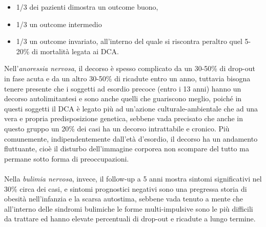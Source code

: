 \begin{itemize}
\item
  1/3 dei pazienti dimostra un outcome buono,
\item
  1/3 un outcome intermedio
\item
  1/3 un outcome invariato, all'interno del quale si riscontra peraltro
  quel 5-20\% di mortalità legata ai DCA.
\end{itemize}

Nell'\emph{anoressia nervosa}, il decorso è spesso complicato da un
30-50\% di drop-out in fase acuta e da un altro 30-50\% di ricadute
entro un anno, tuttavia bisogna tenere presente che i soggetti ad
esordio precoce (entro i 13 anni) hanno un decorso autolimitantesi e
sono anche quelli che guariscono meglio, poiché in questi soggetti il
DCA è legato più ad un'azione culturale-ambientale che ad una vera e
propria predisposizione genetica, sebbene vada precisato che anche in
questo gruppo un 20\% dei casi ha un decorso intrattabile e cronico. Più
comunemente, indipendentemente dall'età d'esordio, il decorso ha un
andamento fluttuante, cioè il disturbo dell'immagine corporea non
scompare del tutto ma permane sotto forma di preoccupazioni.
\\\\
Nella \emph{bulimia nervosa}, invece, il follow-up a 5 anni mostra
sintomi significativi nel 30\% circa dei casi, e sintomi prognostici
negativi sono una pregressa storia di obesità nell'infanzia e la scarsa
autostima, sebbene vada tenuto a mente che all'interno delle sindromi
bulimiche le forme multi-impulsive sono le più difficili da trattare ed
hanno elevate percentuali di drop-out e ricadute a lungo termine.
